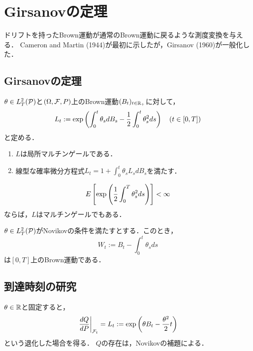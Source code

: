 \documentclass[uplatex,dvipdfmx]{jsreport}
\begin{document}
\section{Girsanovの定理}

\begin{tcolorbox}[colframe=ForestGreen, colback=ForestGreen!10!white,breakable,colbacktitle=ForestGreen!40!white,coltitle=black,fonttitle=\bfseries\sffamily,
title=]
    ドリフトを持ったBrown運動が通常のBrown運動に戻るような測度変換を与える．
    Cameron and Martin (1944)が最初に示したが，Girsanov (1960)が一般化した．
\end{tcolorbox}

\subsection{Girsanovの定理}

\begin{lemma}
    $\theta\in L^2_T(\P)$と$(\Om,\F,P)$上のBrown運動$(B_t)_{t\in\R_+}$に対して，
    \[L_t:=\exp\paren{\int^t_0\theta_sdB_s-\frac{1}{2}\int^t_0\theta^2_sds}\quad(t\in[0,T])\]
    と定める．
    \begin{enumerate}
        \item $L$は局所マルチンゲールである．
        \item 線型な確率微分方程式$L_t=1+\int^t_0\theta_sL_sdB_s$を満たす．
    \end{enumerate}
\end{lemma}

\begin{lemma}[Novikov (1972)]
    \[E\Square{\exp\paren{\frac{1}{2}\int^T_0\theta^2_sds}}<\infty\]
    ならば，$L$はマルチンゲールでもある．
\end{lemma}

\begin{theorem}
    $\theta\in L^2_T(\P)$がNovikovの条件を満たすとする．このとき，
    \[W_t:=B_t-\int^t_0\theta_sds\]
    は$[0,T]$上のBrown運動である．
\end{theorem}

\subsection{到達時刻の研究}

\begin{notation}
    $\theta\in\R$と固定すると，
    \[\left.\frac{dQ}{dP}\right|_{\F_t}=L_t:=\exp\paren{\theta B_t-\frac{\theta^2}{2}t}\]
    という退化した場合を得る．
    $Q$の存在は，Novikovの補題による．
\end{notation}
\end{document}
